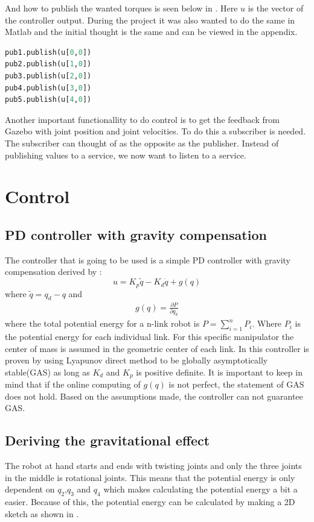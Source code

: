 And how to publish the wanted torques is seen below in . Here $u$ is the vector of the controller output. During the project it was also wanted to do the same in Matlab and the initial thought is the same and can be viewed in the appendix. 

\begin{lstlisting}[language=python,caption={Python code for publish wanted torques},label={lst:pythonPubs}]
pub1.publish(u[0,0])
pub2.publish(u[1,0])
pub3.publish(u[2,0])
pub4.publish(u[3,0])
pub5.publish(u[4,0])
\end{lstlisting}

Another important functionallity to do control is to get the feedback from Gazebo with joint position and joint velocities. To do this a subscriber is needed. The subscriber can thought of as the opposite as the publisher. Instead of publishing values to a service, we now want to listen to a service. 


\section{Control}

\subsection{PD controller with gravity compensation}

The controller that is going to be used is a simple PD controller with gravity compensation derived by \cite{spong}:
$$
    u=K_p\tilde{q} - K_d\dot{q} +g(q)
$$
 where $\tilde{q} = q_d - q$ and 
 \begin{align}\label{eq:gravity}
 g(q) = \frac{\partial P}{\partial q_k}
 \end{align}
 where the total potential energy for a n-link robot is $P = \sum^n_{i=1}P_i$. Where $P_i$ is the potential energy for each individual link. For this specific manipulator the center of mass is assumed in the geometric center of each link. In \cite{Siciliano} this controller is proven by using Lyapunov direct method to be globally asymptotically stable(GAS) as long as $K_d$ and $K_p$ is positive definite. It is important to keep in mind that if the online computing of $g(q)$ is not perfect, the statement of GAS does not hold. Based on the assumptions made, the controller can not guarantee GAS. 
 
 \subsection{Deriving the gravitational effect}
 The robot at hand starts and ends with twisting joints and only the three joints in the middle is rotational joints. This means that the potential energy is only dependent on $q_2$,$q_3$ and $q_4$ which makes calculating the potential energy a bit a easier. Because of this, the potential energy can be calculated by making a 2D sketch as shown in .

